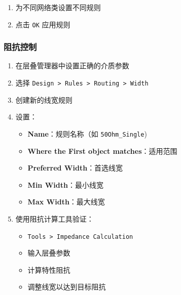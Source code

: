 \begin{enumerate}
\begin{itemize}
\begin{itemize}
          \item Power Plane Clearance：电源平面间距
        \end{itemize}
      \item \textbf{Testpoint}：测试点规则
      \item \textbf{High Speed}：高速规则
        \begin{itemize}
          \item Parallel Segment：平行段规则
          \item Length：长度规则
          \item Matched Net Lengths：等长规则
          \item Differential Pairs Routing：差分对布线
        \end{itemize}
      \item \textbf{Placement}：布局规则
      \item \textbf{Signal Integrity}：信号完整性规则
    \end{itemize}
  \item 为不同网络类设置不同规则
  \item 点击 \lstinline{OK} 应用规则
\end{enumerate}

\subsubsection{阻抗控制}


\begin{enumerate}
  \item 在层叠管理器中设置正确的介质参数
  \item 选择 \lstinline{Design > Rules > Routing > Width}
  \item 创建新的线宽规则
  \item 设置：
    \begin{itemize}
      \item \textbf{Name}：规则名称（如 \lstinline{50Ohm_Single})
      \item \textbf{Where the First object matches}：适用范围
      \item \textbf{Preferred Width}：首选线宽
      \item \textbf{Min Width}：最小线宽
      \item \textbf{Max Width}：最大线宽
    \end{itemize}
  \item 使用阻抗计算工具验证：
    \begin{itemize}
      \item \lstinline{Tools > Impedance Calculation}
      \item 输入层叠参数
      \item 计算特性阻抗
      \item 调整线宽以达到目标阻抗
    \end{itemize}
\end{enumerate}

